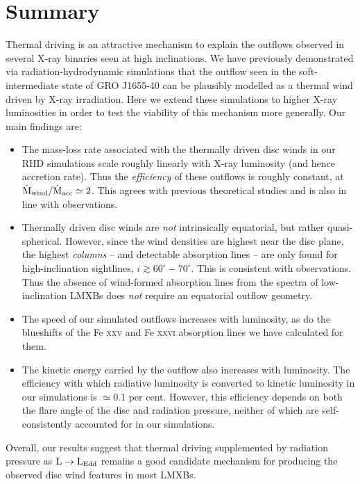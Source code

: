 \documentclass[a4paper,fleqn,usenatbib]{mnras}
\begin{document}
\section{Summary}

Thermal driving is an attractive mechanism to explain the outflows
observed in several X-ray binaries seen at high inclinations. We have
previously demonstrated via radiation-hydrodynamic simulations that
the outflow seen in the soft-intermediate state of GRO J1655-40 can be plausibly
modelled as a thermal wind driven by X-ray irradiation. Here we extend
these simulations to higher X-ray luminosities in order to test the
viability of this mechanism more generally. Our main findings are:

\begin{itemize}
\item{The mass-loss rate associated with the thermally driven disc
  winds in our RHD simulations scale roughly linearly with X-ray
  luminosity (and hence accretion rate). Thus the {\em efficiency} of
  these outflows is roughly constant, at
  $\dot{\rm{M}}_{\rm{wind}}/\dot{\rm{M}}_{\rm{acc}} \simeq 2$. This
  agrees with previous theoretical studies and is also in line with
  observations.}
\item{Thermally driven disc winds are {\em not} intrinsically
  equatorial, but rather quasi-spherical. However, since the wind
  densities are highest near the disc plane, the highest {\em columns}
  -- and detectable absorption lines -- are only found for
  high-inclination sightlines, $i \gtrsim 60^\circ - 70^\circ$. This
  is consistent with observations. Thus the absence of wind-formed
  absorption lines from the spectra of low-inclination LMXBs does {\em
    not} require an equatorial outflow geometry.}
\item{The speed of our simulated outflows increases with luminosity, as do the
  blueshifts of the Fe \textsc{xxv} and Fe \textsc{xxvi} absorption
  lines we have calculated for them.}
\item{The kinetic energy carried by the outflow also increases with
  luminosity. The efficiency with which radiative
  luminosity is converted to kinetic luminosity in our simulations is
  $\simeq$0.1 per cent. However, this efficiency depends on both the flare
  angle of the disc and radiation pressure, neither of
  which are self-consistently accounted for in our simulations.}
\end{itemize}
Overall, our results suggest that thermal driving supplemented by 
radiation pressure as $\rm{L\rightarrow L_{Edd}}$ 
\citep[e.g.][]{2018MNRAS.473..838D} remains 
a good  candidate mechanism for producing the observed disc wind
features in most LMXBs.
\end{document}
